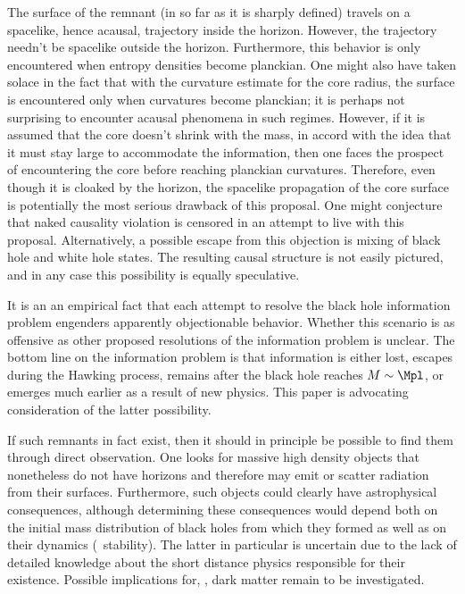 The surface of the
remnant (in so far as it is sharply defined) travels on a spacelike, hence
acausal, trajectory inside the horizon.  However, the trajectory needn't be
spacelike outside the horizon.  Furthermore, this behavior is only
encountered when entropy densities become planckian.  One might also have
taken solace in the fact that with the curvature estimate for the core
radius,
the surface is encountered
only when curvatures become planckian; it is perhaps not surprising
to encounter acausal phenomena in such regimes.   However, if it
is assumed
that the core doesn't shrink with the mass, in accord with the idea
that it must stay large to accommodate the information, then one faces the
prospect of encountering the core before reaching planckian curvatures.
Therefore, even though it is cloaked by
the horizon, the spacelike propagation of the core surface is potentially
the most serious drawback of this proposal.  One might conjecture that
naked causality violation is censored in an attempt to live with this
proposal.
Alternatively, a possible
escape from this objection is mixing of black hole and white hole states.
The resulting causal structure is not easily pictured, and in any case this
possibility is equally speculative.

It is an an empirical fact that each attempt to  resolve the
black hole information problem engenders apparently
objectionable behavior.
Whether this scenario is as
offensive as other proposed resolutions of the
information problem
is unclear.  The bottom line on the information problem is that information
is either lost, escapes during the Hawking process, remains after the
black hole reaches $M\sim\Mpl$, or emerges much earlier as a result of new
physics.
This paper is
advocating consideration of the latter possibility.

If such remnants in fact exist, then it should in principle be
possible to find them through direct observation.
One looks for massive high density objects that
nonetheless do not have horizons and therefore may emit or scatter
radiation from their surfaces.  Furthermore, such objects could
clearly have astrophysical consequences, although determining these
consequences would depend both on the initial mass distribution of
black holes from which they formed as well as on their dynamics (\eg\
stability).
The latter in particular is uncertain due to the lack of
detailed knowledge about the short distance physics responsible for
their existence.
Possible implications for, \eg, dark matter remain to be
investigated.

